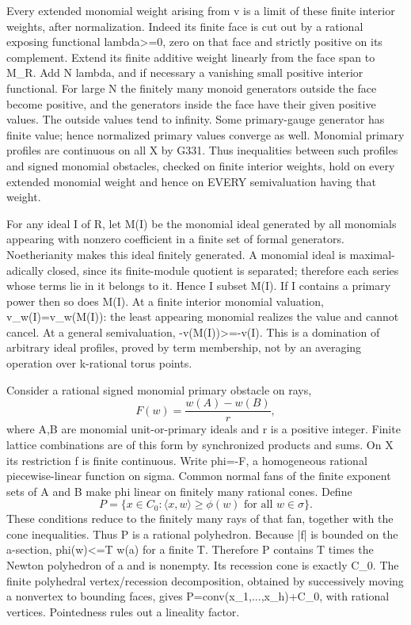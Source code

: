\documentclass[11pt]{article}
\begin{document}
Every extended monomial weight arising from v is a limit of these finite interior weights, after normalization. Indeed its finite face is cut out by a rational exposing functional lambda>=0, zero on that face and strictly positive on its complement. Extend its finite additive weight linearly from the face span to M\_R. Add N lambda, and if necessary a vanishing small positive interior functional. For large N the finitely many monoid generators outside the face become positive, and the generators inside the face have their given positive values. The outside values tend to infinity. Some primary-gauge generator has finite value; hence normalized primary values converge as well. Monomial primary profiles are continuous on all X by G331. Thus inequalities between such profiles and signed monomial obstacles, checked on finite interior weights, hold on every extended monomial weight and hence on EVERY semivaluation having that weight.

For any ideal I of R, let M(I) be the monomial ideal generated by all monomials appearing with nonzero coefficient in a finite set of formal generators. Noetherianity makes this ideal finitely generated. A monomial ideal is maximal-adically closed, since its finite-module quotient is separated; therefore each series whose terms lie in it belongs to it. Hence I subset M(I). If I contains a primary power then so does M(I). At a finite interior monomial valuation, v\_w(I)=v\_w(M(I)): the least appearing monomial realizes the value and cannot cancel. At a general semivaluation, -v(M(I))>=-v(I). This is a domination of arbitrary ideal profiles, proved by term membership, not by an averaging operation over k-rational torus points.

Consider a rational signed monomial primary obstacle on rays,
\[
F(w)=\frac{w(A)-w(B)}r,
\]
where A,B are monomial unit-or-primary ideals and r is a positive integer. Finite lattice combinations are of this form by synchronized products and sums. On X its restriction f is finite continuous. Write phi=-F, a homogeneous rational piecewise-linear function on sigma. Common normal fans of the finite exponent sets of A and B make phi linear on finitely many rational cones. Define
\[
P=\{x\in C_0:\langle x,w\rangle\ge\phi(w)\text{ for all }w\in\sigma\}.
\]
These conditions reduce to the finitely many rays of that fan, together with the cone inequalities. Thus P is a rational polyhedron. Because |f| is bounded on the a-section, phi(w)<=T w(a) for a finite T. Therefore P contains T times the Newton polyhedron of a and is nonempty. Its recession cone is exactly C\_0. The finite polyhedral vertex/recession decomposition, obtained by successively moving a nonvertex to bounding faces, gives P=conv(x\_1,...,x\_h)+C\_0, with rational vertices. Pointedness rules out a lineality factor.
\end{document}

